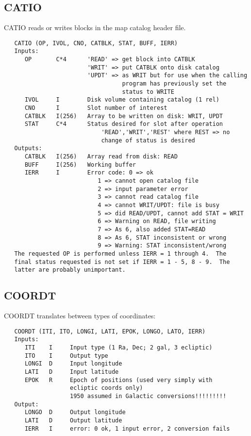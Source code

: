 \subsection{CATIO}
CATIO reads or writes blocks in the map catalog header file.
\begin{verbatim}
   CATIO (OP, IVOL, CNO, CATBLK, STAT, BUFF, IERR)
   Inputs:
      OP       C*4      'READ' => get block into CATBLK
                        'WRIT' => put CATBLK onto disk catalog
                        'UPDT' => as WRIT but for use when the calling
                                  program has previously set the
                                  status to WRITE
      IVOL     I        Disk volume containing catalog (1 rel)
      CNO      I        Slot number of interest
      CATBLK   I(256)   Array to be written on disk: WRIT, UPDT
      STAT     C*4      Status desired for slot after operation
                            'READ','WRIT','REST' where REST => no
                            change of status is desired
   Outputs:
      CATBLK   I(256)   Array read from disk: READ
      BUFF     I(256)   Working buffer
      IERR     I        Error code: 0 => ok
                           1 => cannot open catalog file
                           2 => input parameter error
                           3 => cannot read catalog file
                           4 => cannot WRIT/UPDT: file is busy
                           5 => did READ/UPDT, cannot add STAT = WRIT
                           6 => Warning on READ, file writing
                           7 => As 6, also added STAT=READ
                           8 => As 6, STAT inconsistent or wrong
                           9 => Warning: STAT inconsistent/wrong
   The requested OP is performed unless IERR = 1 through 4.  The
   final status requested is not set if IERR = 1 - 5, 8 - 9.  The
   latter are probably unimportant.
\end{verbatim}

\subsection{COORDT}
COORDT translates between types of coordinates:
\begin{verbatim}
   COORDT (ITI, ITO, LONGI, LATI, EPOK, LONGO, LATO, IERR)
   Inputs:
      ITI    I     Input type (1 Ra, Dec; 2 gal, 3 ecliptic)
      ITO    I     Output type
      LONGI  D     Input longitude
      LATI   D     Input latitude
      EPOK   R     Epoch of positions (used very simply with
                   ecliptic coords only)
                   1950 assumed in Galactic conversions!!!!!!!!!
   Output:
      LONGO  D     Output longitude
      LATI   D     Output latitude
      IERR   I     error: 0 ok, 1 input error, 2 conversion fails
\end{verbatim}

